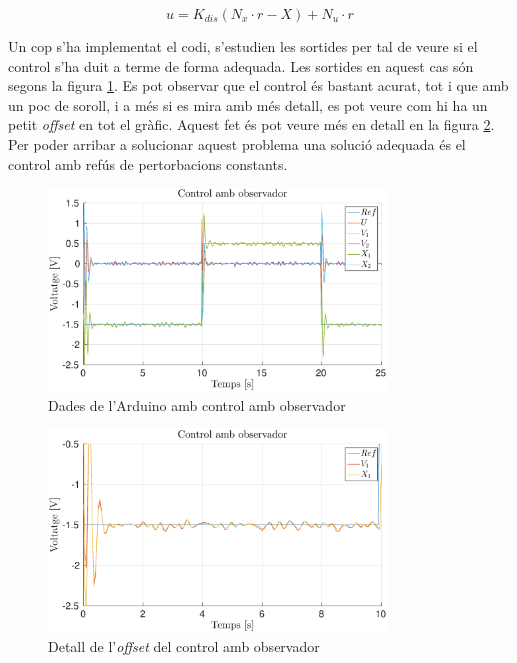 \documentclass[12pt,a4paper,final,twoside,openright]{report}
\begin{document}
\vspace{-11pt}
\begin{equation}\label{eq:obs_u}
u=K_{dis} (N_x \cdot r - X) + N_u \cdot r
\end{equation}

Un cop s'ha implementat el codi, s'estudien les sortides per tal de veure si el control s'ha duit a terme de forma adequada. Les sortides en aquest cas són segons la figura \ref{fig:obs_all}. Es pot observar que el control és bastant acurat, tot i que amb un poc de soroll, i a més si es mira amb més detall, es pot veure com hi ha un petit \textit{offset} en tot el gràfic. Aquest fet és pot veure més en detall en la figura \ref{fig:obs_offset}. Per poder arribar a solucionar aquest problema una solució adequada és el control amb refús de pertorbacions constants.

\begin{figure}[h]
\centering
\includegraphics[width=0.8\textwidth]{Imatges/obs_all.eps}
\caption{Dades de l'Arduino amb control amb observador\label{fig:obs_all}}
\end{figure}

\begin{figure}[h]
\centering
\includegraphics[width=0.8\textwidth]{Imatges/obs_offset.eps}
\caption{Detall de l'\textit{offset} del control amb observador\label{fig:obs_offset}}
\end{figure}
\end{document}
